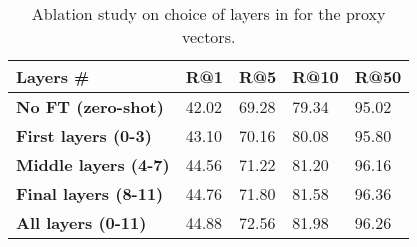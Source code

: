 \begin{table}[ht]
\centering
\caption{Ablation study on choice of layers in for the proxy vectors.}
\label{tab:ablations_proxy_layers}
\begin{tabular}{@{}lllll@{}}
\toprule
 Layers \# & R@1 & R@5 & R@10 & R@50 \\ \midrule
{\bf No FT (zero-shot)} & 42.02 & 69.28 & 79.34 & 95.02 \\
{\bf First layers (0-3)} & 43.10 & 70.16 & 80.08 & 95.80 \\
{\bf Middle layers (4-7)} & 44.56 & 71.22 & 81.20 & 96.16 \\
{\bf Final layers  (8-11)} & 44.76 & 71.80 & 81.58 & 96.36 \\
{\bf All layers  (0-11)} & 44.88 & 72.56 & 81.98 & 96.26 \\
 \bottomrule
\end{tabular}
\end{table}
